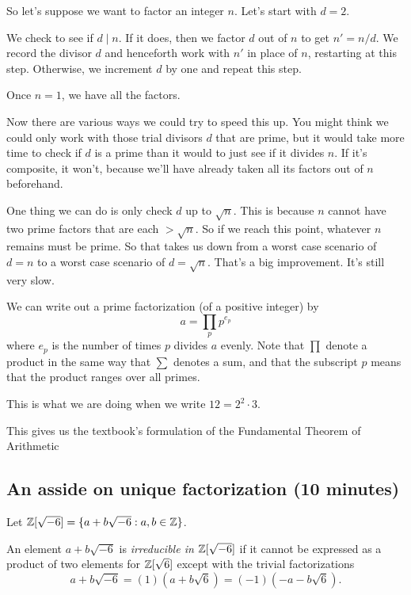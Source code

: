 \documentclass[letterpaper, 11 pt]{article}
\begin{document}
So let's suppose we want to factor an integer $n$. Let's start with $d=2$. 

We check to see if $d\mid n$. If it does, then we factor $d$ out of $n$ to get $n'=n/d$. We record the divisor $d$ and henceforth work with $n'$ in place of $n$, restarting at this step. Otherwise, we increment $d$ by one and repeat this step.

Once $n=1$, we have all the factors.


Now there are various ways we could try to speed this up. You might think we could only work with those trial divisors $d$ that are prime, but it would take more time to check if $d$ is a prime than it would to just see if it divides $n$. If it's composite, it won't, because we'll have already taken all its factors out of $n$ beforehand.

One thing we can do is only check $d$ up to $\sqrt{n}$. This is because $n$ cannot have two prime factors that are each $>\sqrt{n}$. So if we reach this point, whatever $n$ remains must be prime. So that takes us down from a worst case scenario of $d=n$ to a worst case scenario of $d=\sqrt{n}$. That's a big improvement. It's still very slow.


\vspace{1cm}

We can  write out a prime factorization (of a positive integer) by
\[
a=\prod_p p^{e_p}
\]
where $e_p$ is the number of times $p$ divides $a$ evenly. Note that $\prod$ denote a product in the same way that $\sum$ denotes a sum, and that the subscript $p$ means that the product ranges over all primes.

This is what we are doing when we write $12=2^2\cdot 3$.

This gives us the textbook's formulation of the Fundamental Theorem of Arithmetic




\subsection{An asside on unique factorization (10 minutes)}
Let $\mathbb Z[\sqrt{-6}]=\{a+b\sqrt{-6}: a,b\in\mathbb Z\}$.

\begin{defn}
 An element $a+b\sqrt{-6}$ is \emph{irreducible in $\mathbb Z[\sqrt{-6}]$} if it cannot be expressed as a product of two elements for $\mathbb Z[\sqrt{6}]$ except with the trivial factorizations
 \[a+b\sqrt{-6}=(1)(a+b\sqrt{6})=(-1)(-a-b\sqrt{6}).\]
\end{defn}
\end{document}
